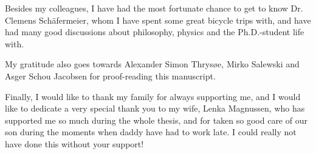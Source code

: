 Besides my colleagues, I have had the most fortunate chance to get to know Dr. Clemens Sch{\"a}fermeier, whom I have spent some great bicycle trips with, and have had many good discussions about philosophy, physics and the Ph.D.-student life with.

My gratitude also goes towards Alexander Simon Thrys{\o}e, Mirko Salewski and Asger Schou Jacobsen for proof-reading this manuscript.

Finally, I would like to thank my family for always supporting me, and I would like to dedicate a very special thank you to my wife, Lenka Magnussen, who has supported me so much during the whole thesis, and for taken so good care of our son during the moments when daddy have had to work late.
I could really not have done this without your support!
